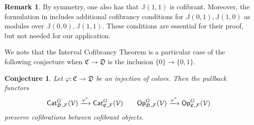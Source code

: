 \documentclass[a4paper,10pt
,draft
]{article}%
\numberwithin{equation}{section}
\numberwithin{figure}{section}
\newtheorem{conjecture}[equation]{Conjecture}%
\theoremstyle{definition} %
\newtheorem{remark}[equation]{Remark}%
\newcommand{\F}{\ensuremath{\mathcal F}}
\newcommand{\V}{\ensuremath{\mathcal V}}
\newcommand{\1}{\ensuremath{\mathbbm 1}}%
\begin{document}
%



\begin{remark}
By symmetry, one also has that $\mathbb{J}(1,1)$ is cofibrant.
Moreover, the formulation in \cite[Thm. 1.15]{BM13}
includes additional cofibrancy conditions for
$\mathbb{J}(0,1),\mathbb{J}(1,0)$
as modules over $\mathbb{J}(0,0),\mathbb{J}(1,1)$.
These conditions are essential for their proof, 
but not needed for our application.
\end{remark}




We note that the Interval Cofibrancy Theorem is a particular case of the following conjecture when $\mathfrak{C} \to \mathfrak{D}$
is the inclusion $\{0\} \to \{0,1\}$.


\begin{conjecture}\label{CATOP CONJ}
Let $\varphi \colon \mathfrak{C} \to \mathfrak{D}$
be an injection of colors.
Then the pullback functors
\[
	\mathsf{Cat}_{\mathfrak{D},\F}^G(\V)
	\xrightarrow{\varphi^{\**}}
	\mathsf{Cat}_{\mathfrak{C},\F}^G(\V)
\qquad
	\mathsf{Op}_{\mathfrak{D},\F}^G(\V)
	\xrightarrow{\varphi^{\**}}
	\mathsf{Op}_{\mathfrak{C},\F}^G(\V)
\]
preserve cofibrations between cofibrant objects.
\end{conjecture}
\end{document}
